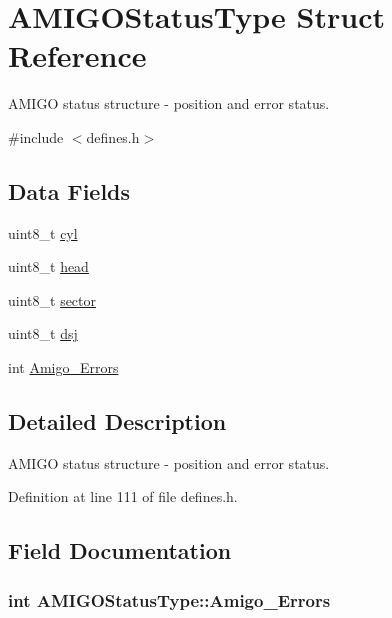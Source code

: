 \hypertarget{structAMIGOStatusType}{}\section{A\+M\+I\+G\+O\+Status\+Type Struct Reference}
\label{structAMIGOStatusType}


A\+M\+I\+GO status structure -\/ position and error status.  




{\ttfamily \#include $<$defines.\+h$>$}

\subsection*{Data Fields}
\begin{DoxyCompactItemize}
\item 
uint8\+\_\+t \hyperlink{structAMIGOStatusType_af5b8f182ebd61f2eb51614fc402b69ee}{cyl}
\item 
uint8\+\_\+t \hyperlink{structAMIGOStatusType_af10e6015013496cad58cfc7a8aec6b1f}{head}
\item 
uint8\+\_\+t \hyperlink{structAMIGOStatusType_ada8db219718dd44d4251d10cbd523117}{sector}
\item 
uint8\+\_\+t \hyperlink{structAMIGOStatusType_a8c10963988b7c4633720397bca443b59}{dsj}
\item 
int \hyperlink{structAMIGOStatusType_a9a729169f4f1ba4761e04996d9f23407}{Amigo\+\_\+\+Errors}
\end{DoxyCompactItemize}


\subsection{Detailed Description}
A\+M\+I\+GO status structure -\/ position and error status. 

Definition at line 111 of file defines.\+h.



\subsection{Field Documentation}
\subsubsection[{\texorpdfstring{Amigo\+\_\+\+Errors}{Amigo_Errors}}]{\setlength{\rightskip}{0pt plus 5cm}int A\+M\+I\+G\+O\+Status\+Type\+::\+Amigo\+\_\+\+Errors}\hypertarget{structAMIGOStatusType_a9a729169f4f1ba4761e04996d9f23407}{}\label{structAMIGOStatusType_a9a729169f4f1ba4761e04996d9f23407}


